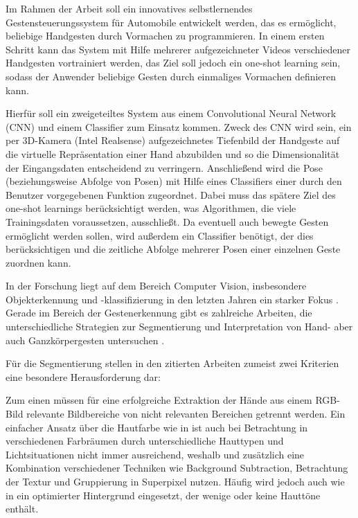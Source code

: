 \documentclass[12pt, a4paper]{book}
\begin{document}
Im Rahmen der Arbeit soll ein innovatives selbstlernendes Gestensteuerungssystem für Automobile entwickelt werden, das es ermöglicht, beliebige Handgesten durch Vormachen zu programmieren. In einem ersten Schritt kann das System mit Hilfe mehrerer aufgezeichneter Videos verschiedener Handgesten vortrainiert werden, das Ziel soll jedoch ein one-shot learning sein, sodass der Anwender beliebige Gesten durch einmaliges Vormachen definieren kann.

Hierfür soll ein zweigeteiltes System aus einem Convolutional Neural Network (CNN) und einem Classifier zum Einsatz kommen. Zweck des CNN wird sein, ein per 3D-Kamera (Intel Realsense) aufgezeichnetes Tiefenbild der Handgeste auf die virtuelle Repräsentation einer Hand abzubilden und so die Dimensionalität der Eingangsdaten entscheidend zu verringern. Anschließend wird die Pose (beziehungsweise Abfolge von Posen) mit Hilfe eines Classifiers einer durch den Benutzer vorgegebenen Funktion zugeordnet. Dabei muss das spätere Ziel des one-shot learnings berücksichtigt werden, was Algorithmen, die viele Trainingsdaten voraussetzen, ausschließt. Da eventuell auch bewegte Gesten ermöglicht werden sollen, wird außerdem ein Classifier benötigt, der dies berücksichtigen und die zeitliche Abfolge mehrerer Posen einer einzelnen Geste zuordnen kann.

In der Forschung liegt auf dem Bereich Computer Vision, insbesondere Objekterkennung und -klassifizierung in den letzten Jahren ein starker Fokus \cite{FeiFei}. Gerade im Bereich der Gestenerkennung gibt es zahlreiche Arbeiten, die unterschiedliche Strategien zur Segmentierung und Interpretation von Hand- aber auch Ganzkörpergesten untersuchen \cite{Zimmermann03.05.2017,Sato1317March2001,Supancic2018,Tompson2014,Zhang23.10.2016,OhnBar2014,Ge2019,Keskin2012,Li2013,Jones2002}. 


Für die Segmentierung stellen in den zitierten Arbeiten zumeist zwei Kriterien eine besondere Herausforderung dar:

Zum einen müssen für eine erfolgreiche Extraktion der Hände aus einem RGB-Bild relevante Bildbereiche von nicht relevanten Bereichen getrennt werden. Ein einfacher Ansatz über die Hautfarbe wie in \cite{Sato1317March2001} ist auch bei Betrachtung in verschiedenen Farbräumen durch unterschiedliche Hauttypen und Lichtsituationen nicht immer ausreichend, weshalb \cite{Zhang23.10.2016} und \cite{Li2013} zusätzlich eine Kombination verschiedener Techniken wie Background Subtraction, Betrachtung der Textur und Gruppierung in Superpixel nutzen. Häufig wird jedoch auch wie in \cite{Sridhar2013} ein optimierter Hintergrund eingesetzt, der wenige oder keine Hauttöne enthält.
\end{document}
